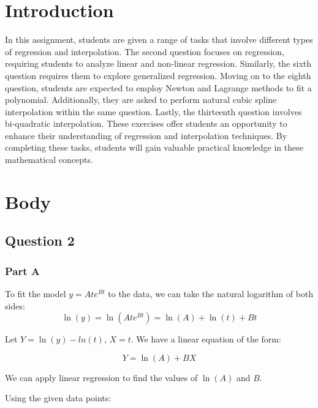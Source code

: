 \documentclass[12pt, a4paper]{article}
\numberwithin{equation}{section}
\begin{document}


\newpage
    \renewcommand{\contentsname}{Table of Contents}
    \tableofcontents
    \listoffigures
\newpage

\section{Introduction}

In this assignment, students are given a range of tasks that involve different types of regression and interpolation. The second question focuses on regression, requiring students to analyze linear and non-linear regression. Similarly, the sixth question requires them to explore generalized regression. Moving on to the eighth question, students are expected to employ Newton and Lagrange methods to fit a polynomial. Additionally, they are asked to perform natural cubic spline interpolation within the same question. Lastly, the thirteenth question involves bi-quadratic interpolation. These exercises offer students an opportunity to enhance their understanding of regression and interpolation techniques. By completing these tasks, students will gain valuable practical knowledge in these mathematical concepts.

\section{Body}
\subsection{Question 2}


\subsubsection{Part A}
To fit the model $y = Ate^{Bt}$ to the data, we can take the natural logarithm of both sides:
\begin{equation}
    \ln(y) = \ln(Ate^{Bt}) = \ln(A) + \ln(t) + Bt
\end{equation}

Let $Y = \ln(y) - ln(t)$, $X = t$. We have a linear equation of the form:

\begin{equation}
    Y = \ln(A) + BX
\end{equation}

We can apply linear regression to find the values of $\ln(A)$ and $B$.

Using the given data points:
\end{document}

